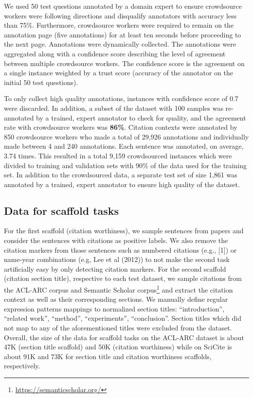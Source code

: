 \documentclass[11pt,a4paper]{article}
\newcommand{\ourdata}{SciCite\xspace}
\begin{document}
We used 50 test questions annotated by a domain expert to ensure crowdsource workers were following directions and disqualify annotators with accuracy less than 75\%. Furthermore, crowdsource workers were required to remain on the annotation page (five annotations) for at least ten seconds before proceeding to the next page. Annotations were dynamically collected. The annotations were aggregated along with a confidence score describing the level of agreement between multiple crowdsource workers. The confidence score is the agreement on a single instance weighted by a trust score (accuracy of the annotator on the initial 50 test questions).




To only collect high quality annotations, instances with confidence score of 0.7 were discarded.
In addition, a subset of the dataset with 100 samples was re-annotated by a trained, expert annotator to check for quality, and the agreement rate with crowdsource workers was \textbf{86\%}. Citation contexts were annotated by 850 crowdsource workers who made a total of 29,926 annotations and individually made between 4 and 240 annotations. Each sentence was annotated, on average, 3.74 times. This resulted in a total 9,159 crowdsourced instances which were divided to training and validation sets with 90\% of the data used for the training set.
In addition to the crowdsourced data, a separate test set of size 1,861 was annotated by a trained, expert annotator to ensure high quality of the dataset.

\subsection{Data for scaffold tasks}

For the first scaffold (citation worthiness), we sample sentences from papers and consider the sentences with citations as positive labels. We also remove the citation markers from those sentences such as numbered citations (e.g., [1]) or name-year combinations (e.g, Lee et al (2012)) to not make the second task artificially easy by only detecting citation markers.
For the second scaffold (citation section title), respective to each test dataset, we sample citations from the ACL-ARC corpus and Semantic Scholar corpus\footnote{\url{https://semanticscholar.org/}} and extract the citation context as well as their corresponding sections. We manually define regular expression patterns mappings to normalized section titles: {``introduction'', ``related work'', ``method'', ``experiments'', ``conclusion''}. Section titles which did not map to any of the aforementioned titles were excluded from the dataset.
Overall, the size of the data for scaffold tasks on the ACL-ARC dataset is about 47K (section title scaffold) and 50K (citation worthiness) while on \ourdata is about 91K and 73K for section title and citation worthiness scaffolds, respectively.
\end{document}
